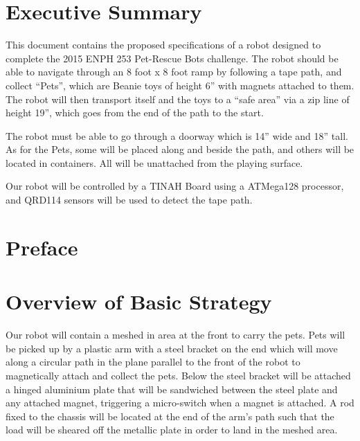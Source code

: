 \documentclass[11pt, oneside]{article} %
\begin{document}
\section*{Executive Summary}
This document contains the proposed specifications of a robot designed to complete the 2015 ENPH 253 Pet-Rescue Bots challenge. The robot should be able to navigate through an 8 foot x 8 foot ramp by following a tape path, and collect “Pets”, which are Beanie toys of height 6” with magnets attached to them. The robot will then transport itself and the toys to a “safe area” via a zip line of height 19”, which goes from the end of the path to the start.

The robot must be able to go through a doorway which is 14” wide and 18” tall. As for the Pets, some will be placed along and beside the path, and others will be located in containers. All will be unattached from the playing surface.

Our robot will be controlled by a TINAH Board using a ATMega128 processor, and QRD114 sensors will be used to detect the tape path.

\newpage


\tableofcontents %
\listoffigures %
\listoftables %


\newpage

\section{Preface}

\section{Overview of Basic Strategy}

Our robot will contain a meshed in area at the front to carry the pets. Pets will be picked up by a plastic arm with a steel bracket on the end which will move along a circular path in the plane parallel to the front of the robot to magnetically attach and collect the pets. Below the steel bracket will be attached a hinged aluminium plate that will be sandwiched between the steel plate and any attached magnet, triggering a micro-switch when a magnet is attached. A rod fixed to the chassis will be located at the end of the arm's path such that the load will be sheared off the metallic plate in order to land in the meshed area.
\end{document}
